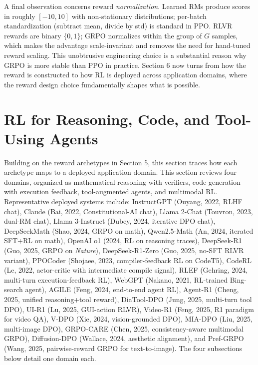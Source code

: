 \documentclass{article}
\begin{document}
A final observation concerns reward \emph{normalization}. Learned RMs produce scores in roughly \([-10, 10]\) with non-stationary distributions; per-batch standardization (subtract mean, divide by std) is standard in PPO. RLVR rewards are binary \(\{0, 1\}\); GRPO normalizes within the group of \(G\) samples, which makes the advantage scale-invariant and removes the need for hand-tuned reward scaling. This unobtrusive engineering choice is a substantial reason why GRPO is more stable than PPO in practice. Section 6 now turns from how the reward is constructed to how RL is deployed across application domains, where the reward design choice fundamentally shapes what is possible.

\section{RL for Reasoning, Code, and Tool-Using Agents}\label{rl-for-reasoning-code-and-tool-using-agents}

Building on the reward archetypes in Section 5, this section traces how each archetype maps to a deployed application domain. This section reviews four domains, organized as mathematical reasoning with verifiers, code generation with execution feedback, tool-augmented agents, and multimodal RL. Representative deployed systems include: InstructGPT (Ouyang, 2022, RLHF chat), Claude (Bai, 2022, Constitutional-AI chat), Llama 2-Chat (Touvron, 2023, dual-RM chat), Llama 3-Instruct (Dubey, 2024, iterative DPO chat), DeepSeekMath (Shao, 2024, GRPO on math), Qwen2.5-Math (An, 2024, iterated SFT+RL on math), OpenAI o1 (2024, RL on reasoning traces), DeepSeek-R1 (Guo, 2025, GRPO on \emph{Nature}), DeepSeek-R1-Zero (Guo, 2025, no-SFT RLVR variant), PPOCoder (Shojaee, 2023, compiler-feedback RL on CodeT5), CodeRL (Le, 2022, actor-critic with intermediate compile signal), RLEF (Gehring, 2024, multi-turn execution-feedback RL), WebGPT (Nakano, 2021, RL-trained Bing-search agent), AGILE (Feng, 2024, end-to-end agent RL), Agent-R1 (Cheng, 2025, unified reasoning+tool reward), DiaTool-DPO (Jung, 2025, multi-turn tool DPO), UI-R1 (Lu, 2025, GUI-action RLVR), Video-R1 (Feng, 2025, R1 paradigm for video QA), V-DPO (Xie, 2024, vision-grounded DPO), MIA-DPO (Liu, 2025, multi-image DPO), GRPO-CARE (Chen, 2025, consistency-aware multimodal GRPO), Diffusion-DPO (Wallace, 2024, aesthetic alignment), and Pref-GRPO (Wang, 2025, pairwise-reward GRPO for text-to-image). The four subsections below detail one domain each.
\end{document}
